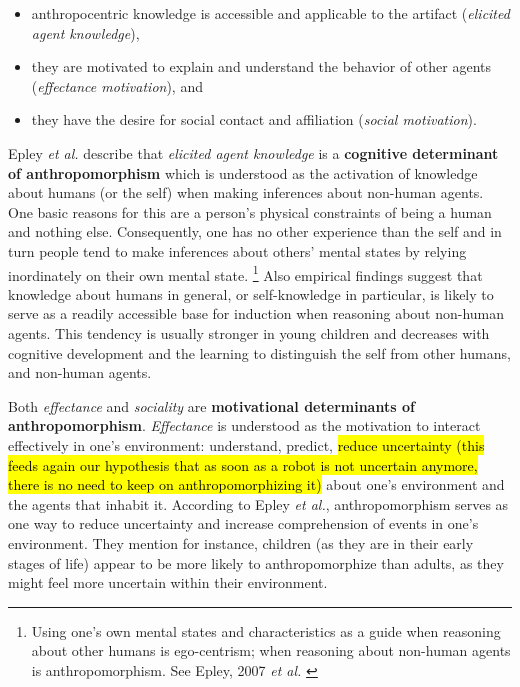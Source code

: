 \documentclass{frontiersSCNS} %
\begin{document}
\begin{itemize}
	\item anthropocentric knowledge is accessible and applicable to the artifact (\textit{elicited agent knowledge}),
	\item they are motivated to explain and understand the behavior of other agents (\textit{effectance motivation}), and
	\item they have the desire for social contact and affiliation (\textit{social motivation}).
\end{itemize}

Epley \textit{et al.} describe that \textit{elicited agent knowledge} is a
\textbf{cognitive determinant  of anthropomorphism} which is understood as the
activation of knowledge about humans (or the self) when making inferences about
non-human agents. One basic reasons for this are a person's physical constraints
of being a human and nothing else. Consequently, one has no other experience
than the self and in turn people tend to make inferences about others' mental
states by relying inordinately on their own mental state. \footnote{Using one's
own mental states and characteristics as a guide when reasoning about other
humans is ego-centrism; when reasoning about non-human agents is
anthropomorphism. See Epley, 2007 \textit{et al.} \cite{epley_seeing_2007}} Also
empirical findings suggest that knowledge about humans in general, or
self-knowledge in particular, is likely to serve as a readily accessible base
for induction when reasoning about non-human agents. This tendency is usually
stronger in young children and decreases with cognitive development and the
learning to distinguish the self from other humans, and non-human agents. 
	
Both \textit{effectance} and \textit{sociality} are \textbf{motivational
determinants of anthropomorphism}. \textit{Effectance} is understood as the
motivation to interact effectively in one's environment: understand, predict,
\hl{reduce uncertainty (this feeds again our hypothesis that as soon as a robot
is not uncertain anymore, there is no need to keep on anthropomorphizing
it)}
about one's environment and the agents that inhabit it. According to Epley
\textit{et al.}, anthropomorphism serves as one way to reduce uncertainty and
increase comprehension of events in one's environment. They mention for
instance, children (as they are in their early stages of life) appear to be more
likely to anthropomorphize than adults, as they might feel more uncertain within
their environment.
\end{document}
